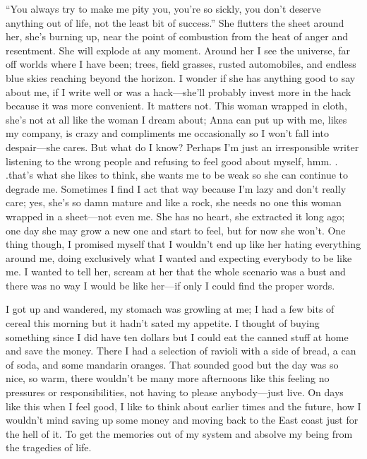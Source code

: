 ``You always try to make me pity you, you're so sickly, you don't
deserve anything out of life, not the least bit of success.'' She
flutters the sheet around her, she's burning up, near the point of
combustion from the heat of anger and resentment. She will explode at
any moment. Around her I see the universe, far off worlds where I have
been; trees, field grasses, rusted automobiles, and endless blue skies
reaching beyond the horizon. I wonder if she has anything good to say
about me, if I write well or was a hack---she'll probably invest more in
the hack because it was more convenient. It matters not. This woman
wrapped in cloth, she's not at all like the woman I dream about; Anna
can put up with me, likes my company, is crazy and compliments me
occasionally so I won't fall into despair---she cares. But what do I
know? Perhaps I'm just an irresponsible writer listening to the wrong
people and refusing to feel good about myself, hmm. . .that's what she
likes to think, she wants me to be weak so she can continue to degrade
me. Sometimes I find I act that way because I'm lazy and don't really
care; yes, she's so damn mature and like a rock, she needs no one this
woman wrapped in a sheet---not even me. She has no heart, she extracted
it long ago; one day she may grow a new one and start to feel, but for
now she won't. One thing though, I promised myself that I wouldn't end
up like her hating everything around me, doing exclusively what I wanted
and expecting everybody to be like me. I wanted to tell her, scream at
her that the whole scenario was a bust and there was no way I would be
like her---if only I could find the proper words.

I got up and wandered, my stomach was growling at me; I had a few bits
of cereal this morning but it hadn't sated my appetite. I thought of
buying something since I did have ten dollars but I could eat the canned
stuff at home and save the money. There I had a selection of ravioli
with a side of bread, a can of soda, and some mandarin oranges. That
sounded good but the day was so nice, so warm, there wouldn't be many
more afternoons like this feeling no pressures or responsibilities, not
having to please anybody---just live. On days like this when I feel
good, I like to think about earlier times and the future, how I wouldn't
mind saving up some money and moving back to the East coast just for the
hell of it. To get the memories out of my system and absolve my being
from the tragedies of life.

